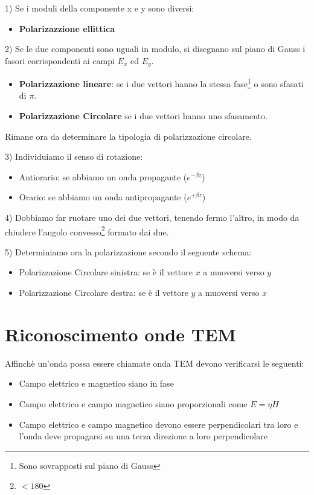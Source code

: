 \documentclass[10pt,a4paper]{report}
\begin{document}
	\raggedright	{1) Se i moduli della componente x e y sono diversi:}

	\begin{itemize} 
	\item \textbf{Polarizazzione ellittica}
	\end{itemize}
	\raggedright{	2) Se le due componenti sono uguali in modulo, si disegnano sul piano di Gauss i fasori corrispondenti ai campi $E_x$ ed $E_y$.}
	\begin{itemize}
	\item \textbf{Polarizzazione lineare}: se i due vettori hanno la stessa fase\footnote{Sono sovrapposti sul piano di Gauss} o sono sfasati di $\pi$.
	\item \textbf{Polarizzazione Circolare} se i due vettori hanno uno sfasamento.
	\end{itemize}
		
	Rimane ora da determinare la tipologia di polarizzazione circolare.
	
	\raggedright{3) Individuiamo il senso di rotazione:}

	\begin{itemize}

	\item Antiorario: se abbiamo un onda propagante ($e^{-\beta z}$)
	\item Orario: se abbiamo un onda antipropagante ($e^{+\beta z}$)

	\end{itemize}
	\raggedright{4) Dobbiamo far ruotare uno dei due vettori, tenendo fermo l'altro, in modo da chiudere l'angolo convesso\footnote{$<180$} formato dai due.}

	\raggedright{	5) Determiniamo ora la polarizzazione secondo il seguente schema:}

	\begin{itemize}
	\item Polarizzazione Circolare sinistra: se è il vettore $x$ a muoversi verso $y$ 
	\item Polarizzazione Circolare destra: se è il vettore $y$ a muoversi verso $x$ 
	\end{itemize}	


	\section{Riconoscimento onde TEM}
	Affinchè un'onda possa essere chiamate onda TEM devono verificarsi le seguenti:

	\begin{itemize}

	\item Campo elettrico e magnetico siano in fase 

	\item Campo elettrico e campo magnetico siano proporzionali come $E=\eta H$

	\item Campo elettrico e campo magnetico devono essere perpendicolari tra loro e l'onda deve propagarsi su una terza direzione a loro perpendicolare

	\end{itemize}
\end{document}
